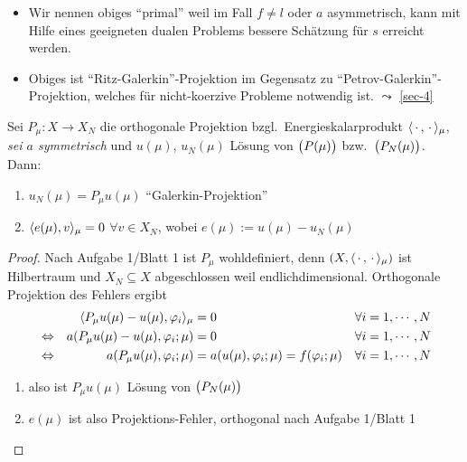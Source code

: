 \begin{bem} \beginwithlistbem
	\begin{itemize}
		\item Wir nennen obiges ``primal'' weil im Fall $f \neq l$ oder $a$ asymmetrisch, kann mit Hilfe eines geeigneten dualen Problems bessere Schätzung für $s$ erreicht werden.
		\item Obiges ist ``Ritz-Galerkin''-Projektion im Gegensatz zu ``Petrov-Galerkin''-Projektion, welches für nicht-koerzive Probleme notwendig ist. $\leadsto$ \ref{sec-4}
	\end{itemize}
\end{bem}

\begin{satz}
	Sei $P_\mu : X \to X_N$ die orthogonale Projektion bzgl.\ Energieskalarprodukt $\langle \,\cdot\,, \,\cdot\, \rangle_\mu$, \emph{sei $a$ symmetrisch} und $u(\mu)$, $u_N(\mu)$ Lösung von $\big(P(\mu)\big)$ bzw.\ $\big(P_N(\mu)\big)$.
	Dann:
	\begin{enumerate}
		\item $u_N(\mu) = P_\mu u(\mu)$ ``Galerkin-Projektion''
		\item $\langle e(\mu), v \rangle_\mu = 0$ $\forall v \in X_N$, wobei $e(\mu) := u(\mu) - u_N(\mu)$
	\end{enumerate}

	\begin{proof}
		Nach Aufgabe 1/Blatt 1 ist $P_\mu$ wohldefiniert, denn $(X,\langle \,\cdot\,, \,\cdot\, \rangle_\mu)$ ist Hilbertraum und $X_N \subseteq X$ abgeschlossen weil endlichdimensional.
		Orthogonale Projektion des Fehlers ergibt
		\begin{align*}
			& & \langle P_\mu u(\mu) - u(\mu), \varphi_i \rangle_\mu &= 0 & \forall i = 1,\cdots,N &\\
			& \Leftrightarrow & a(P_\mu u(\mu) - u(\mu), \varphi_i; \mu) &= 0 & \forall i = 1,\cdots,N &\\
			& \Leftrightarrow & a(P_\mu u(\mu), \varphi_i; \mu) &= a(u(\mu),\varphi_i;\mu) = f(\varphi_i;\mu) & \forall i = 1,\cdots,N &
		\end{align*}
		\begin{enumerate}
			\item also ist $P_\mu u(\mu)$ Lösung von $\big(P_N(\mu)\big)$
			\item $e(\mu)$ ist also Projektions-Fehler, orthogonal nach Aufgabe 1/Blatt 1
		\end{enumerate}
	\end{proof}
\end{satz}


